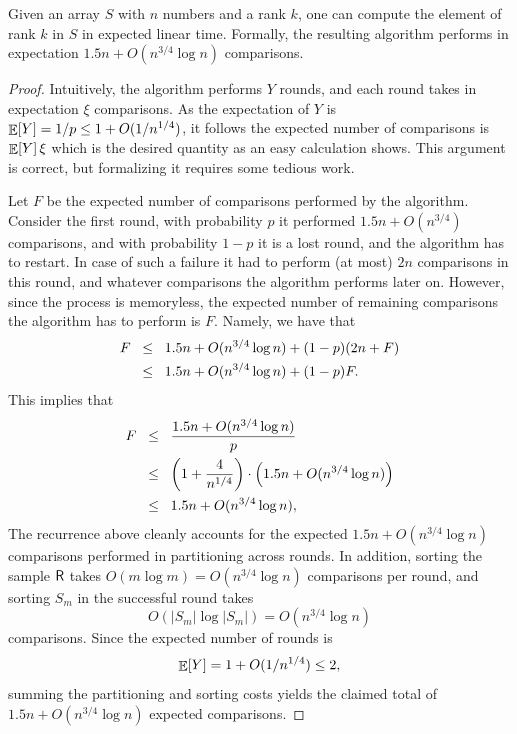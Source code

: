\begin{theorem}
    Given an array $S$ with $n$ numbers and a rank $k$, one can compute
    the element of rank $k$ in $S$ in expected linear time.
    Formally, the resulting algorithm performs in expectation
    $1.5 n + O( n^{3/4} \log n)$ comparisons.
\end{theorem}
\begin{proof}
    Intuitively, the algorithm performs $Y$ rounds, and each round takes
    in expectation $\xi$ comparisons. As the expectation of $Y$ is
    $\mathop{\mathbb{E}}\!\left[ {Y} \right] = 1/p \leq 1 + O(1/n^{1/4})$, it follows the expected number of
    comparisons is $\mathop{\mathbb{E}}\!\left[ {Y} \right] \xi$ which is the desired quantity as an easy
    calculation shows. This argument is correct, but formalizing it
    requires some tedious work.

    Let $F$ be the expected number of comparisons performed by the
    algorithm. Consider the first round, with probability $p$ it
    performed $1.5n + O(n^{3/4})$ comparisons, and with probability $1-p$
    it is a lost round, and the algorithm has to restart. In case of such
    a failure it had to perform (at most) $2n$ comparisons in this round,
    and whatever comparisons the algorithm performs later on. However,
    since the process is memoryless, the expected number of remaining
    comparisons the algorithm has to perform is $F$. Namely, we have that
    \begin{align*}
        F
        &\LEQ
        1.5n + O(n^{3/4} \log n) + (1-p)(2n + F)
        \\&%
        \LEQ%
        1.5n + O(n^{3/4} \log n) +(1-p) F.
    \end{align*}
    This implies that
    \begin{align*}
        F
        &\LEQ
        \frac{1.5 n + O(n^{3/4} \log n) }{p}
        \\&
        \LEQ
        {\pth{ 1 + \frac{4}{n^{1/4}}}}
        \cdot \pth{1.5 n + O(n^{3/4}\log n) }
        \\&%
        \LEQ%
        1.5n + O(n^{3/4} \log n),
    \end{align*}
    The recurrence above cleanly accounts for the expected
    $1.5n + O(n^{3/4} \log n)$ comparisons performed in partitioning across
     rounds. In addition, sorting the sample $\mathsf{R}$ takes
    $O(m \log m) = O(n^{3/4} \log n)$ comparisons per round, and sorting
    $S_m$ in the  successful round takes
    \begin{equation*}
        O(|S_m| \log |S_m|) = O(n^{3/4} \log n)
    \end{equation*}
    comparisons. Since the expected number of rounds is
    \[
        \mathop{\mathbb{E}}\!\left[ {Y} \right] = 1 + O(1/n^{1/4}) \leq 2,
    \]
    summing the partitioning and sorting costs yields the claimed total
    of $1.5n + O(n^{3/4} \log n)$ expected comparisons.
\end{proof}

